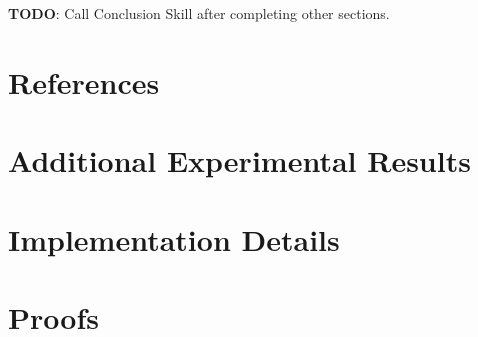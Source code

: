 \documentclass{article}
\begin{document}
\textbf{TODO}: Call Conclusion Skill after completing other sections.

\begin{ack}
%
\end{ack}

\section*{References}

{
\small


% 
% 


}

\appendix

\section{Additional Experimental Results}
\label{sec:appendix-results}


\section{Implementation Details}
\label{sec:appendix-implementation}


\section{Proofs}
\label{sec:appendix-proofs}


% 
\end{document}
